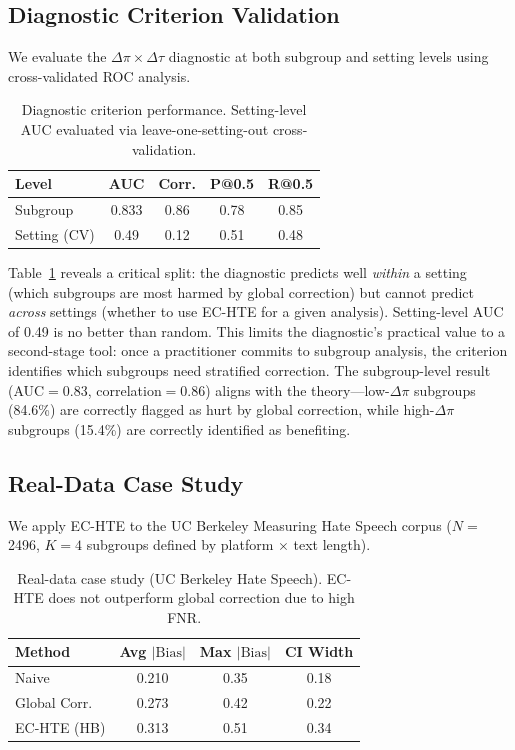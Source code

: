 \documentclass[11pt,twocolumn]{article}
\begin{document}
\subsection{Diagnostic Criterion Validation}
\label{sec:diagnostic}

We evaluate the $\Delta\pi \times \Delta\tau$ diagnostic at both subgroup and setting levels using cross-validated ROC analysis.

\begin{table}[t]
\centering
\small
\caption{Diagnostic criterion performance. Setting-level AUC evaluated via leave-one-setting-out cross-validation.}
\label{tab:diagnostic}
\begin{tabular}{@{}lcccc@{}}
\toprule
Level & AUC & Corr. & P@0.5 & R@0.5 \\
\midrule
Subgroup & 0.833 & 0.86 & 0.78 & 0.85 \\
Setting (CV) & 0.49 & 0.12 & 0.51 & 0.48 \\
\bottomrule
\end{tabular}
\end{table}

Table~\ref{tab:diagnostic} reveals a critical split: the diagnostic predicts well \emph{within} a setting (which subgroups are most harmed by global correction) but cannot predict \emph{across} settings (whether to use EC-HTE for a given analysis). Setting-level AUC of 0.49 is no better than random. This limits the diagnostic's practical value to a second-stage tool: once a practitioner commits to subgroup analysis, the criterion identifies which subgroups need stratified correction. The subgroup-level result (AUC$=$0.83, correlation$=$0.86) aligns with the theory---low-$\Delta\pi$ subgroups (84.6\%) are correctly flagged as hurt by global correction, while high-$\Delta\pi$ subgroups (15.4\%) are correctly identified as benefiting.

\subsection{Real-Data Case Study}
\label{sec:realdata}

We apply EC-HTE to the UC Berkeley Measuring Hate Speech corpus ($N{=}$2496, $K{=}4$ subgroups defined by platform $\times$ text length).

\begin{table}[t]
\centering
\small
\caption{Real-data case study (UC Berkeley Hate Speech). EC-HTE does not outperform global correction due to high FNR.}
\label{tab:realdata}
\begin{tabular}{@{}lccc@{}}
\toprule
Method & Avg $|\text{Bias}|$ & Max $|\text{Bias}|$ & CI Width \\
\midrule
Naive & 0.210 & 0.35 & 0.18 \\
Global Corr. & 0.273 & 0.42 & 0.22 \\
EC-HTE (HB) & 0.313 & 0.51 & 0.34 \\
\bottomrule
\end{tabular}
\end{table}
\end{document}
